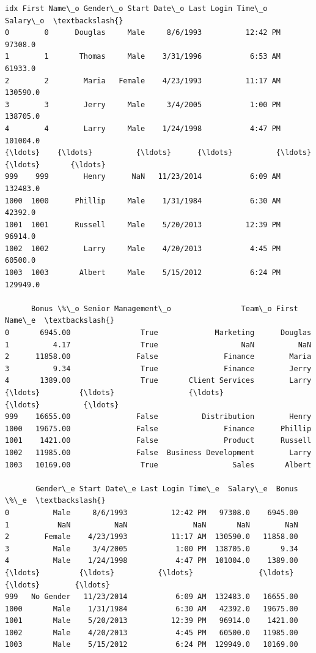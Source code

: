\documentclass [oneside,10pt,a4paper,ngerman,BCOR10mm,headsepline,parindent,final]{scrartcl}
\makeatletter
\newcommand{\boxspacing}{\kern\kvtcb@left@rule\kern\kvtcb@boxsep}
\newcommand{\prompt}[4]{
        {\ttfamily\llap{{\color{#2}[#3]:\hspace{3pt}#4}}\vspace{-\baselineskip}}
    }
\makeatother
\begin{document}
            \begin{tcolorbox}[breakable, size=fbox, boxrule=.5pt, pad at break*=1mm, opacityfill=0]
\prompt{Out}{outcolor}{43}{\boxspacing}
\begin{Verbatim}[commandchars=\\\{\}]
       idx First Name\_o Gender\_o Start Date\_o Last Login Time\_o  Salary\_o  \textbackslash{}
0        0      Douglas     Male     8/6/1993          12:42 PM   97308.0
1        1       Thomas     Male    3/31/1996           6:53 AM   61933.0
2        2        Maria   Female    4/23/1993          11:17 AM  130590.0
3        3        Jerry     Male     3/4/2005           1:00 PM  138705.0
4        4        Larry     Male    1/24/1998           4:47 PM  101004.0
{\ldots}    {\ldots}          {\ldots}      {\ldots}          {\ldots}               {\ldots}       {\ldots}
999    999        Henry      NaN   11/23/2014           6:09 AM  132483.0
1000  1000      Phillip     Male    1/31/1984           6:30 AM   42392.0
1001  1001      Russell     Male    5/20/2013          12:39 PM   96914.0
1002  1002        Larry     Male    4/20/2013           4:45 PM   60500.0
1003  1003       Albert     Male    5/15/2012           6:24 PM  129949.0

      Bonus \%\_o Senior Management\_o                Team\_o First Name\_e  \textbackslash{}
0       6945.00                True             Marketing      Douglas
1          4.17                True                   NaN          NaN
2      11858.00               False               Finance        Maria
3          9.34                True               Finance        Jerry
4       1389.00                True       Client Services        Larry
{\ldots}         {\ldots}                 {\ldots}                   {\ldots}          {\ldots}
999    16655.00               False          Distribution        Henry
1000   19675.00               False               Finance      Phillip
1001    1421.00               False               Product      Russell
1002   11985.00               False  Business Development        Larry
1003   10169.00                True                 Sales       Albert

       Gender\_e Start Date\_e Last Login Time\_e  Salary\_e  Bonus \%\_e  \textbackslash{}
0          Male     8/6/1993          12:42 PM   97308.0    6945.00
1           NaN          NaN               NaN       NaN        NaN
2        Female    4/23/1993          11:17 AM  130590.0   11858.00
3          Male     3/4/2005           1:00 PM  138705.0       9.34
4          Male    1/24/1998           4:47 PM  101004.0    1389.00
{\ldots}         {\ldots}          {\ldots}               {\ldots}       {\ldots}        {\ldots}
999   No Gender   11/23/2014           6:09 AM  132483.0   16655.00
1000       Male    1/31/1984           6:30 AM   42392.0   19675.00
1001       Male    5/20/2013          12:39 PM   96914.0    1421.00
1002       Male    4/20/2013           4:45 PM   60500.0   11985.00
1003       Male    5/15/2012           6:24 PM  129949.0   10169.00


\end{Verbatim}
\end{tcolorbox}
\end{document}
